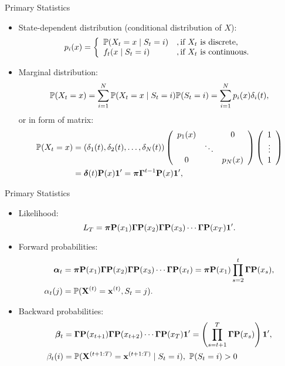 \begin{frame}[fragile,t]{Primary Statistics}
	\begin{itemize}
	\item State-dependent distribution (conditional distribution of $X$):
		\[ p_i(x) = \left \{ 
        \begin{array}{l l}
        \mathbb{P}(X_t = x \mid S_t = i) & ,\text{if}\ X_t\ \text{is discrete,} \\
        f_t(x \mid S_t = i) & ,\text{if}\ X_t\ \text{is continuous.} \\
        \end{array} \right. \]
	\item Marginal distribution:
		\[ \mathbb{P}(X_t = x) = \sum_{i=1}^{N} \mathbb{P}(X_t = x \mid S_t = i)\mathbb{P}(S_t = i) 
		= \sum_{i=1}^N p_i(x)\delta_i(t), \]
        or in form of matrix:
        \[ \begin{aligned}
		\mathbb{P}(X_t = x) & = (\delta_1(t),\delta_2(t),\dots,\delta_N(t)) 
			\left ( \begin{array} {c c c}
				p_1(x) & & 0 \\
				& \ddots & \\
				0 & & p_N(x) \\
			\end{array} \right)
			\left ( \begin{array} {c}
				1 \\	\vdots \\	1 \\
			\end{array} \right) \\
		& = {\boldsymbol\delta}(t){\mathbf P}(x){\mathbf{1}^{\prime}} = {\boldsymbol\pi}{\boldsymbol\Gamma}^{t-1}{\mathbf P}(x){\mathbf{1}^{\prime}},
        \end{aligned} \]
    \end{itemize}
\end{frame}

\begin{frame}[fragile,t]{Primary Statistics}
    \begin{itemize}
    \item Likelihood:
		\[ L_T = {\boldsymbol\pi}{\mathbf P}(x_1){\boldsymbol\Gamma}{\mathbf P}(x_2){\boldsymbol\Gamma}{\mathbf P}(x_3)\cdots{\boldsymbol\Gamma}{\mathbf P}(x_T){\mathbf{1}^{\prime}}. \]
	\item Forward probabilities:
		\[ \begin{aligned}
		{\boldsymbol\alpha}_t & = {\boldsymbol\pi}{\mathbf P}(x_1){\boldsymbol\Gamma}{\mathbf P}(x_2){\boldsymbol\Gamma}{\mathbf P}(x_3)\cdots{\boldsymbol\Gamma}{\mathbf P}(x_t)
		= {\boldsymbol\pi}{\mathbf P}(x_1)\prod_{s=2}^{t}{\boldsymbol\Gamma}{\mathbf P}(x_s),\\
		\alpha_t(j) & = \mathbb{P}({\mathbf X}^{(t)} = {\mathbf x}^{(t)}, S_t = j).
		\end{aligned} \]
	\item Backward probabilities:
		\[ \begin{aligned}
		{\boldsymbol\beta}_t & = {\boldsymbol\Gamma}{\mathbf P}(x_{t+1}){\boldsymbol\Gamma}{\mathbf P}(x_{t+2})\cdots{\boldsymbol\Gamma}{\mathbf P}(x_T){\mathbf{1}^{\prime}}
		= \left(\prod_{s=t+1}^{T}{\boldsymbol\Gamma}{\mathbf P}(x_s)\right){\mathbf{1}^{\prime}}, \\
		\beta_t(i) & = \mathbb{P}({\mathbf X}^{(t+1:T)} = {\mathbf x}^{(t+1:T)} \mid S_t = i),\ \mathbb{P}(S_t = i)>0
		\end{aligned} \]
	\end{itemize}
\end{frame}

